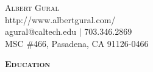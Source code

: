 \documentclass{article}
\newenvironment{changemargin}[2]{%
  \begin{list}{}{%
    \setlength{\topsep}{0pt}%
    \setlength{\leftmargin}{#1}%
    \setlength{\rightmargin}{#2}%
    \setlength{\listparindent}{\parindent}%
    \setlength{\itemindent}{\parindent}%
    \setlength{\parsep}{\parskip}%
  }%
  \item[]}{\end{list}
}
\newcommand{\lineover}{
	\begin{changemargin}{-0.05in}{-0.05in}
		\vspace*{-8pt}
		\hrulefill \\
		\vspace*{-2pt}
	\end{changemargin}
}
\newcommand{\header}[1]{
	\begin{changemargin}{-0.5in}{-0.5in}
		{\large \textbf{\scshape{#1}}}\\
  	\lineover
	\end{changemargin}
}
\newcommand{\contact}[6]{
	\begin{changemargin}{1in}{1in}
		\begin{center}
			{\LARGE \scshape {#1}}\\ \smallskip
			{#4}\\ \smallskip
			{#2} \hfill {#5}\\ \smallskip
			{#3} \hfill {#6}\\ \smallskip 
		\end{center}
	\end{changemargin}
}
\begin{document}
\begin{changemargin}{0.5in}{0.5in}
	\begin{center}
		{\huge \scshape {Albert Gural}}\\ \smallskip
		{http://www.albertgural.com/}\\ \smallskip
		{\small agural@caltech.edu $|$ 703.346.2869}\\
		{\footnotesize MSC \#466, Pasadena, CA 91126-0466}
	\end{center}
\end{changemargin}



\header{Education}
\end{document}
